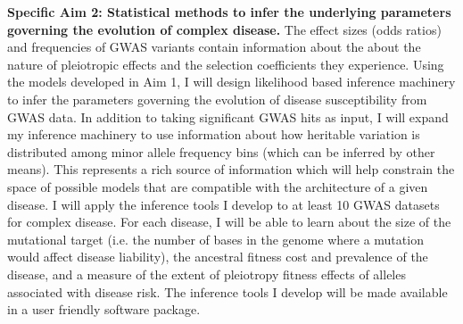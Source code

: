 \documentclass[11pt]{article}
\begin{document}
\textbf{Specific Aim 2: Statistical methods to infer the underlying parameters governing the evolution of complex disease.} The effect sizes (odds ratios) and frequencies of GWAS variants contain information about the about the nature of pleiotropic effects and the selection coefficients they experience. Using the models developed in Aim 1, I will design likelihood based inference machinery to infer the parameters governing the evolution of disease susceptibility from GWAS data. In addition to taking significant GWAS hits as input, I will expand my inference machinery to use information about how heritable variation is distributed among minor allele frequency bins (which can be inferred by other means). This represents a rich source of information which will help constrain the space of possible models that are compatible with the architecture of a given disease. I will apply the inference tools I develop to at least 10 GWAS datasets for complex disease. For each disease, I will be able to learn about the size of the mutational target (i.e. the number of bases in the genome where a mutation would affect disease liability), the ancestral fitness cost and prevalence of the disease, and a measure of the extent of pleiotropy fitness effects of alleles associated with disease risk. The inference tools I develop will be made available in a user friendly software package.

\end{document}
